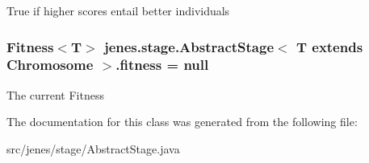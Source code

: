 True if higher scores entail better individuals \hypertarget{classjenes_1_1stage_1_1_abstract_stage_3_01_t_01extends_01_chromosome_01_4_697ab8239c1ae2a99445cd7f5fbca45d}{
\subsubsection[fitness]{\setlength{\rightskip}{0pt plus 5cm}Fitness$<$T$>$ jenes.stage.AbstractStage$<$ T extends Chromosome $>$.{\bf fitness} = null}}
\label{classjenes_1_1stage_1_1_abstract_stage_3_01_t_01extends_01_chromosome_01_4_697ab8239c1ae2a99445cd7f5fbca45d}


The current Fitness 

The documentation for this class was generated from the following file:\begin{CompactItemize}
\item 
src/jenes/stage/AbstractStage.java\end{CompactItemize}

